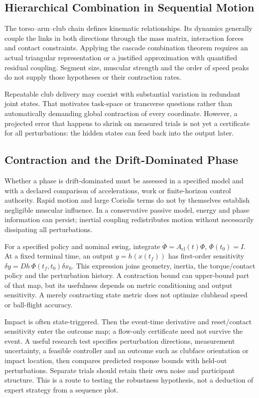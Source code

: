 \subsection{Hierarchical Combination in Sequential Motion}

The torso--arm--club chain defines kinematic relationships. Its dynamics generally couple the links in both directions through the mass matrix, interaction forces and contact constraints. Applying the cascade combination theorem requires an actual triangular representation or a justified approximation with quantified residual coupling. Segment size, muscular strength and the order of speed peaks do not supply those hypotheses or their contraction rates.

Repeatable club delivery may coexist with substantial variation in redundant joint states. That motivates task-space or transverse questions rather than automatically demanding global contraction of every coordinate. However, a projected error that happens to shrink on measured trials is not yet a certificate for all perturbations: the hidden states can feed back into the output later.

\subsection{Contraction and the Drift-Dominated Phase}

Whether a phase is drift-dominated must be assessed in a specified model and with a declared comparison of accelerations, work or finite-horizon control authority. Rapid motion and large Coriolis terms do not by themselves establish negligible muscular influence. In a conservative passive model, energy and phase information can persist; inertial coupling redistributes motion without necessarily dissipating all perturbations.

For a specified policy and nominal swing, integrate $\dot\Phi=A_{\mathrm{cl}}(t)\Phi$, $\Phi(t_0)=I$. At a fixed terminal time, an output $y=h(x(t_f))$ has first-order sensitivity $\delta y=D h\,\Phi(t_f,t_0)\delta x_0$. This expression joins geometry, inertia, the torque/contact policy and the perturbation history. A contraction bound can upper-bound part of that map, but its usefulness depends on metric conditioning and output sensitivity. A merely contracting state metric does not optimize clubhead speed or ball-flight accuracy.

Impact is often state-triggered. Then the event-time derivative and reset/contact sensitivity enter the outcome map; a flow-only certificate need not survive the event. A useful research test specifies perturbation directions, measurement uncertainty, a feasible controller and an outcome such as clubface orientation or impact location, then compares predicted response bounds with held-out perturbations. Separate trials should retain their own noise and participant structure. This is a route to testing the robustness hypothesis, not a deduction of expert strategy from a sequence plot.


